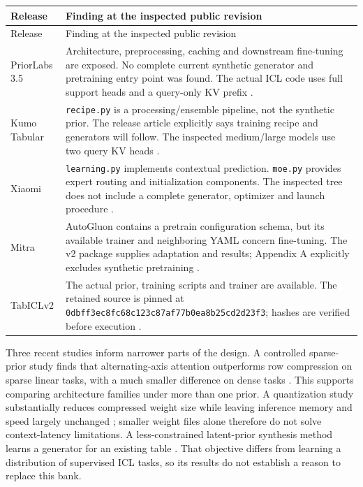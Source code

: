\documentclass[11pt]{article}
\begin{document}
\begin{longtable}{@{}p{.19\linewidth}p{.73\linewidth}@{}}
\toprule Release & Finding at the inspected public revision\\\midrule\endfirsthead
\toprule Release & Finding at the inspected public revision\\\midrule\endhead
PriorLabs 3.5 & Architecture, preprocessing, caching and downstream fine-tuning are exposed. No complete current synthetic generator and pretraining entry point was found. The actual ICL code uses full support heads and a query-only KV prefix \cite{priorlabs-code}.\\
Kumo Tabular & \texttt{recipe.py} is a processing/ensemble pipeline, not the synthetic prior. The release article explicitly says training recipe and generators will follow. The inspected medium/large models use two query KV heads \cite{kumo,kumo-code}.\\
Xiaomi & \texttt{learning.py} implements contextual prediction. \texttt{moe.py} provides expert routing and initialization components. The inspected tree does not include a complete generator, optimizer and launch procedure \cite{xiaomi-code}.\\
Mitra & AutoGluon contains a pretrain configuration schema, but its available trainer and neighboring YAML concern fine-tuning. The v2 package supplies adaptation and results; Appendix A explicitly excludes synthetic pretraining \cite{mitra2,mitra-code}.\\
TabICLv2 & The actual prior, training scripts and trainer are available. The retained source is pinned at \texttt{0dbff3ec8fc68c123c87af77b0ea8b25cd2d23f3}; hashes are verified before execution \cite{tabicl-code}.\\
\bottomrule
\end{longtable}

Three recent studies inform narrower parts of the design. A controlled sparse-prior study finds that alternating-axis attention outperforms row compression on sparse linear tasks, with a much smaller difference on dense tasks \cite{sparsealignment}. This supports comparing architecture families under more than one prior. A quantization study substantially reduces compressed weight size while leaving inference memory and speed largely unchanged \cite{memoryefficient}; smaller weight files alone therefore do not solve context-latency limitations. A less-constrained latent-prior synthesis method learns a generator for an existing table \cite{lessconstrained}. That objective differs from learning a distribution of supervised ICL tasks, so its results do not establish a reason to replace this bank.
\end{document}
